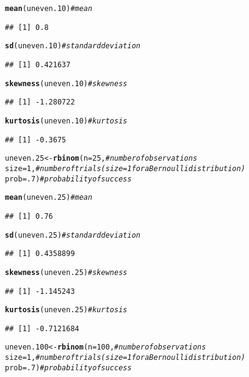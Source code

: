 \documentclass{article}\usepackage[]{graphicx}\usepackage[]{color}
\makeatletter
\newcommand{\hlnum}[1]{\textcolor[rgb]{0.686,0.059,0.569}{#1}}%
\newcommand{\hlcom}[1]{\textcolor[rgb]{0.678,0.584,0.686}{\textit{#1}}}%
\newcommand{\hlstd}[1]{\textcolor[rgb]{0.345,0.345,0.345}{#1}}%
\newcommand{\hlkwb}[1]{\textcolor[rgb]{0.69,0.353,0.396}{#1}}%
\newcommand{\hlkwc}[1]{\textcolor[rgb]{0.333,0.667,0.333}{#1}}%
\newcommand{\hlkwd}[1]{\textcolor[rgb]{0.737,0.353,0.396}{\textbf{#1}}}%
\newenvironment{kframe}{%
 \def\at@end@of@kframe{}%
 \ifinner\ifhmode%
  \def\at@end@of@kframe{\end{minipage}}%
  \begin{minipage}{\columnwidth}%
 \fi\fi%
 \def\FrameCommand##1{\hskip\@totalleftmargin \hskip-\fboxsep
 \colorbox{shadecolor}{##1}\hskip-\fboxsep
     \hskip-\linewidth \hskip-\@totalleftmargin \hskip\columnwidth}%
 \MakeFramed {\advance\hsize-\width
   \@totalleftmargin\z@ \linewidth\hsize
   \@setminipage}}%
 {\par\unskip\endMakeFramed%
 \at@end@of@kframe}
\newenvironment{knitrout}{}{} %
\makeatother
\begin{document}
\begin{enumerate}
\begin{enumerate}
\begin{knitrout}
\begin{kframe}
\begin{alltt}
\hlkwd{mean}\hlstd{(uneven.10)}                  \hlcom{#mean}
\end{alltt}
\begin{verbatim}
## [1] 0.8
\end{verbatim}
\begin{alltt}
\hlkwd{sd}\hlstd{(uneven.10)}                    \hlcom{#standard deviation}
\end{alltt}
\begin{verbatim}
## [1] 0.421637
\end{verbatim}
\begin{alltt}
\hlkwd{skewness}\hlstd{(uneven.10)}              \hlcom{#skewness}
\end{alltt}
\begin{verbatim}
## [1] -1.280722
\end{verbatim}
\begin{alltt}
\hlkwd{kurtosis}\hlstd{(uneven.10)}              \hlcom{#kurtosis}
\end{alltt}
\begin{verbatim}
## [1] -0.3675
\end{verbatim}
\begin{alltt}
\hlstd{uneven.25}  \hlkwb{<-} \hlkwd{rbinom}\hlstd{(}\hlkwc{n}\hlstd{=}\hlnum{25}\hlstd{,}       \hlcom{#number of observations}
                   \hlkwc{size}\hlstd{=}\hlnum{1}\hlstd{,}       \hlcom{#number of trials (size=1 for a Bernoulli distribution)}
                   \hlkwc{prob}\hlstd{=}\hlnum{.7}\hlstd{)}      \hlcom{#probability of success}

\hlkwd{mean}\hlstd{(uneven.25)}                  \hlcom{#mean}
\end{alltt}
\begin{verbatim}
## [1] 0.76
\end{verbatim}
\begin{alltt}
\hlkwd{sd}\hlstd{(uneven.25)}                    \hlcom{#standard deviation}
\end{alltt}
\begin{verbatim}
## [1] 0.4358899
\end{verbatim}
\begin{alltt}
\hlkwd{skewness}\hlstd{(uneven.25)}              \hlcom{#skewness}
\end{alltt}
\begin{verbatim}
## [1] -1.145243
\end{verbatim}
\begin{alltt}
\hlkwd{kurtosis}\hlstd{(uneven.25)}              \hlcom{#kurtosis}
\end{alltt}
\begin{verbatim}
## [1] -0.7121684
\end{verbatim}
\begin{alltt}
\hlstd{uneven.100} \hlkwb{<-} \hlkwd{rbinom}\hlstd{(}\hlkwc{n}\hlstd{=}\hlnum{100}\hlstd{,}      \hlcom{#number of observations}
                   \hlkwc{size}\hlstd{=}\hlnum{1}\hlstd{,}       \hlcom{#number of trials (size=1 for a Bernoulli distribution)}
                   \hlkwc{prob}\hlstd{=}\hlnum{.7}\hlstd{)}      \hlcom{#probability of success}


\end{alltt}
\end{kframe}
\end{knitrout}
\end{enumerate}
\end{enumerate}
\end{document}
